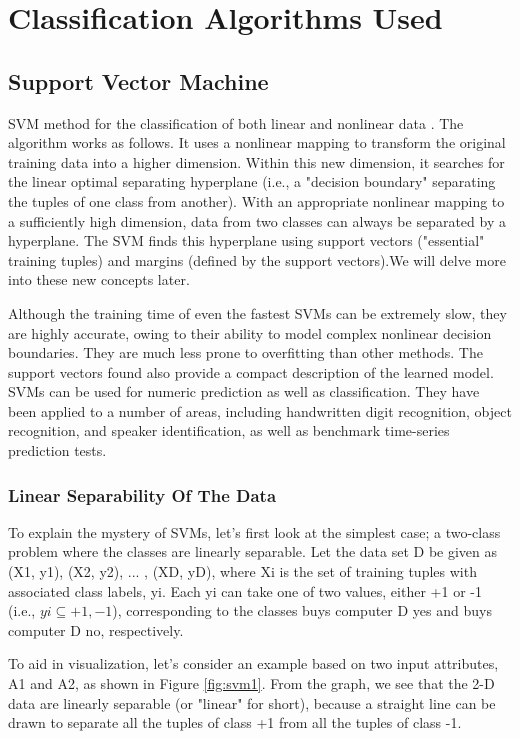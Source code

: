 \section{Classification Algorithms Used}

\subsection{Support Vector Machine}
SVM method for the classification of both linear and nonlinear data \cite{classifications}. The algorithm works as follows. It uses a nonlinear mapping to transform the original training data into a higher dimension. Within this new dimension, it searches for the linear optimal separating hyperplane (i.e., a "decision boundary" separating the tuples of one class from another). With an appropriate nonlinear mapping to a sufficiently high dimension, data from two classes can always be separated by a hyperplane. The SVM finds this hyperplane using support vectors ("essential" training tuples) and margins (defined by the support vectors).We will delve more into these new concepts later.


Although the training time of even the fastest SVMs can be extremely slow, they are highly accurate, owing to their ability to model complex nonlinear decision boundaries. They are much less prone to overfitting than other methods. The support vectors found also provide a compact description of the learned model. SVMs can be used for numeric prediction as well as classification. They have been applied to a number of areas, including handwritten digit recognition, object recognition, and speaker identification, as well as benchmark time-series prediction tests.
 \bigskip
\subsubsection{Linear Separability Of The Data}
To explain the mystery of SVMs, let's first look at the simplest case; a two-class problem where the classes are linearly separable. Let the data set D be given as (X1, y1),
(X2, y2), ... , (XD, yD), where Xi is the set of training tuples with associated class labels, yi. Each yi can take one of two values, either +1 or -1 (i.e., $yi \subseteq{+1,-1}$), corresponding to the classes buys computer D yes and buys computer D no, respectively.\bigskip

To aid in visualization, let's consider an example based on two input attributes, A1 and A2, as shown in Figure \ref{fig:svm1}. From the graph, we see that the 2-D data are linearly separable (or "linear" for short), because a straight line can be drawn to separate all the tuples of class +1 from all the tuples of class -1.\bigskip

